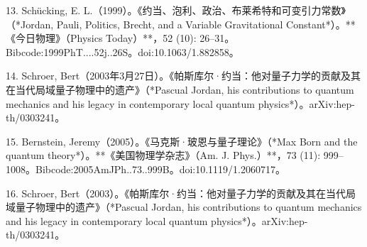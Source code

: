 13. Schücking, E. L.（1999）。《约当、泡利、政治、布莱希特和可变引力常数》（*Jordan, Pauli, Politics, Brecht, and a Variable Gravitational Constant*）。**《今日物理》（Physics Today）**，52 (10): 26–31。Bibcode:1999PhT....52j..26S。doi:10.1063/1.882858。

14. Schroer, Bert（2003年3月27日）。《帕斯库尔·约当：他对量子力学的贡献及其在当代局域量子物理中的遗产》（*Pascual Jordan, his contributions to quantum mechanics and his legacy in contemporary local quantum physics*）。arXiv:hep-th/0303241。

15. Bernstein, Jeremy（2005）。《马克斯·玻恩与量子理论》（*Max Born and the quantum theory*）。**《美国物理学杂志》（Am. J. Phys.）**，73 (11): 999–1008。Bibcode:2005AmJPh..73..999B。doi:10.1119/1.2060717。

16. Schroer, Bert（2003）。《帕斯库尔·约当：他对量子力学的贡献及其在当代局域量子物理中的遗产》（*Pascual Jordan, his contributions to quantum mechanics and his legacy in contemporary local quantum physics*）。arXiv:hep-th/0303241。
